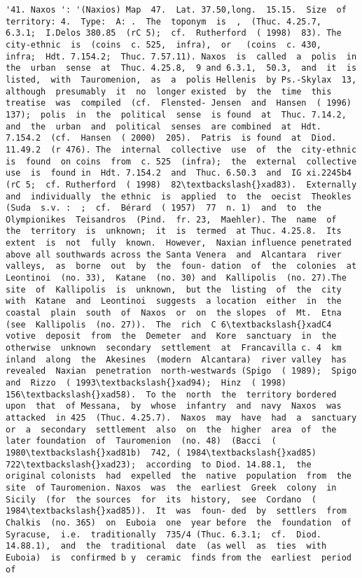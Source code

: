 \documentclass[11pt]{article}
\begin{document}
\begin{Verbatim}[commandchars=\\\{\}]
         '41. Naxos ': '(Naxios) Map  47.  Lat. 37.50,long.  15.15.  Size  of territory: 4.  Type:  A: .  The  toponym  is  ,  (Thuc. 4.25.7,  6.3.1;  I.Delos 380.85  (rC 5);  cf.  Rutherford  ( 1998)  83). The  city-ethnic  is  (coins  c. 525,  infra),  or   (coins  c. 430,  infra;  Hdt. 7.154.2;  Thuc. 7.57.11). Naxos  is  called  a  polis  in  the  urban  sense  at  Thuc. 4.25.8,  9 and 6.3.1,  50.3,  and  it  is  listed,  with  Tauromenion,  as  a  polis Hellenis  by Ps.-Skylax  13,  although  presumably  it  no  longer existed  by  the  time  this  treatise  was  compiled  (cf.  Flensted- Jensen  and  Hansen  ( 1996)  137);  polis  in  the  political  sense  is found  at  Thuc. 7.14.2,  and  the  urban  and  political  senses  are combined  at  Hdt. 7.154.2  (cf.  Hansen  ( 2000)  205).  Patris  is found  at  Diod. 11.49.2  (r 476). The  internal  collective  use  of  the  city-ethnic  is  found  on coins  from  c. 525  (infra);  the  external  collective  use  is  found in  Hdt. 7.154.2  and  Thuc. 6.50.3  and  IG xi.2245b4  (rC 5;  cf. Rutherford  ( 1998)  82\textbackslash{}xad83).  Externally  and  individually  the ethnic  is  applied  to  the  oecist  Theokles  (Suda  s.v. :  ;  cf.  Bérard  ( 1957)  77  n. 1)  and  to  the Olympionikes  Teisandros  (Pind.  fr. 23,  Maehler). The  name  of  the  territory  is  unknown;  it  is  termed  at Thuc. 4.25.8.  Its  extent  is  not  fully  known.  However,  Naxian influence penetrated above all southwards across the Santa Venera  and  Alcantara  river  valleys,  as  borne  out  by  the  foun- dation  of  the  colonies  at  Leontinoi  (no. 33),  Katane  (no. 30) and  Kallipolis  (no. 27).The  site  of  Kallipolis  is  unknown,  but the  listing  of  the  city  with  Katane  and  Leontinoi  suggests  a location  either  in  the  coastal  plain  south  of  Naxos  or  on  the slopes  of  Mt.  Etna  (see  Kallipolis  (no. 27)).  The  rich  C 6\textbackslash{}xadC4 votive  deposit  from  the  Demeter  and  Kore  sanctuary  in  the otherwise  unknown  secondary  settlement  at  Francavilla c. 4  km  inland  along  the  Akesines  (modern  Alcantara)  river valley  has  revealed  Naxian  penetration  north-westwards (Spigo  ( 1989);  Spigo  and  Rizzo  ( 1993\textbackslash{}xad94);  Hinz  ( 1998) 156\textbackslash{}xad58).  To the  north  the  territory bordered  upon  that  of Messana,  by  whose  infantry  and  navy  Naxos  was  attacked  in 425  (Thuc. 4.25.7).  Naxos  may  have  had  a  sanctuary  or  a  secondary  settlement  also  on  the  higher  area  of  the  later foundation  of  Tauromenion  (no. 48)  (Bacci  ( 1980\textbackslash{}xad81b)  742, ( 1984\textbackslash{}xad85)  722\textbackslash{}xad23);  according  to Diod. 14.88.1,  the  original colonists  had  expelled  the  native  population  from  the  site  of Tauromenion. Naxos  was  the  earliest  Greek  colony  in  Sicily  (for  the sources  for  its  history,  see  Cordano  ( 1984\textbackslash{}xad85)).  It  was  foun- ded  by  settlers  from  Chalkis  (no. 365)  on  Euboia  one  year before  the  foundation  of  Syracuse,  i.e.  traditionally  735/4 (Thuc. 6.3.1;  cf.  Diod. 14.88.1),  and  the  traditional  date  (as well  as  ties  with  Euboia)  is  confirmed b y  ceramic  finds from the  earliest  period  of  
\end{Verbatim}
\end{document}
